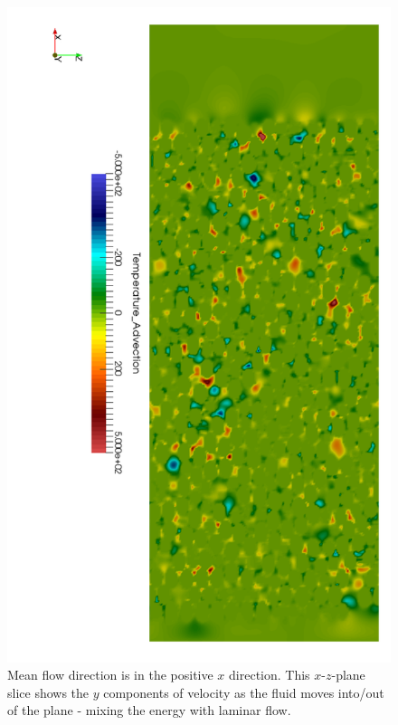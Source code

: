 \begin{figure}[t]
    \centering
    \includegraphics[width=\singleimagewidth]{chapters/figures/lbm/lbm-laminar-mixing}
    \caption{Mean flow direction is in the positive $x$ direction. This $x$-$z$-plane slice shows the $y$ components of velocity as the fluid moves into/out of the plane - mixing the energy with laminar flow.}\label{fig:lbm-laminar-mixing}
\end{figure}

\FloatBarrier